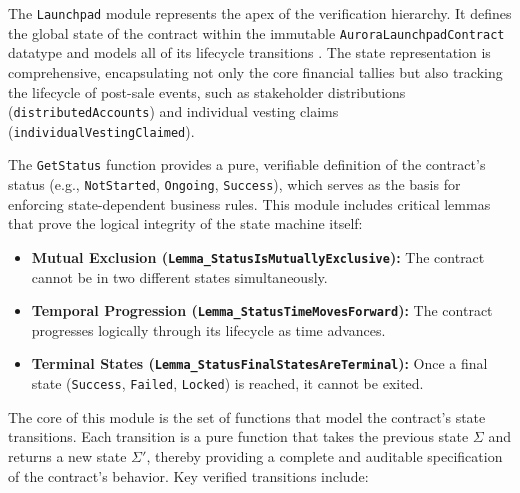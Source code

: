 \documentclass[
  english,
  onecolumn]{article}
\providecommand{\tightlist}{%
  \setlength{\itemsep}{0pt}\setlength{\parskip}{0pt}}
\begin{document}
The \texttt{Launchpad} module represents the apex of the verification
hierarchy. It defines the global state of the contract within the
immutable \texttt{AuroraLaunchpadContract} datatype and models all of
its lifecycle transitions \citep{hirai2017defining}. The state
representation is comprehensive, encapsulating not only the core
financial tallies but also tracking the lifecycle of post-sale events,
such as stakeholder distributions (\texttt{distributedAccounts}) and
individual vesting claims (\texttt{individualVestingClaimed}).

The \texttt{GetStatus} function provides a pure, verifiable definition
of the contract's status (e.g., \texttt{NotStarted}, \texttt{Ongoing},
\texttt{Success}), which serves as the basis for enforcing
state-dependent business rules. This module includes critical lemmas
that prove the logical integrity of the state machine itself:

\begin{itemize}
\tightlist
\item
  \textbf{Mutual Exclusion (\texttt{Lemma\_StatusIsMutuallyExclusive}):}
  The contract cannot be in two different states simultaneously.
\item
  \textbf{Temporal Progression
  (\texttt{Lemma\_StatusTimeMovesForward}):} The contract progresses
  logically through its lifecycle as time advances.
\item
  \textbf{Terminal States
  (\texttt{Lemma\_StatusFinalStatesAreTerminal}):} Once a final state
  (\texttt{Success}, \texttt{Failed}, \texttt{Locked}) is reached, it
  cannot be exited.
\end{itemize}

The core of this module is the set of functions that model the
contract's state transitions. Each transition is a pure function that
takes the previous state \(\Sigma\) and returns a new state \(\Sigma'\),
thereby providing a complete and auditable specification of the
contract's behavior. Key verified transitions include:
\end{document}
